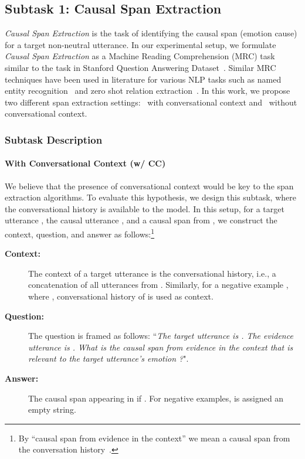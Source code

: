 \documentclass[smallextended]{svjour3}
\newcommand\0{\hphantom{0}}
\begin{document}
\subsection{Subtask 1: Causal Span Extraction}
\label{sec:cse}
\textit{Causal Span Extraction} is the task of identifying the causal span (emotion cause) for a target non-neutral utterance. In our experimental setup, we formulate \textit{Causal Span Extraction} as a Machine Reading Comprehension (MRC) task similar to the task in Stanford Question Answering Dataset~\citep{rajpurkar2016squad}. Similar MRC techniques have been used in literature for various NLP tasks such as named entity recognition~\citep{li-etal-2020-unified} and zero shot relation extraction~\citep{levy-etal-2017-zero}. In this work, we propose two different span extraction settings: \textit{}~with conversational context and \textit{}~without conversational context.


\subsubsection{Subtask Description}









\paragraph{With Conversational Context (w/ CC)}
We 
believe
that the presence of conversational context would be key to the span extraction algorithms. To evaluate this hypothesis, we design this subtask, where the conversational history is available to the model. In this setup, for a target utterance , the causal utterance , and a causal span  from , we construct the context, question, and answer as follows:\footnote{By ``causal span from evidence in the context'' we mean a causal span from the conversation history~.}
\begin{description}
\item[\textbf{Context:}] The context of a target utterance  is the conversational history, i.e., a concatenation of all utterances from .
Similarly, for a negative example , where , conversational history of  is used as context.\\
\item[\textbf{Question:}] The question is framed as follows: ``\textit{The target utterance is . The evidence utterance is . What is the causal span from evidence in the context that is relevant to the target utterance's emotion ?}".
\item[\textbf{Answer:}] The causal span  appearing in  if . For negative examples,  is assigned an empty string. 
\end{description}
\end{document}
